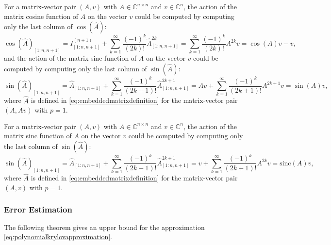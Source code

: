 \begin{corollary}
    \label{cor:embeddedmatrixsineandcosine}
    For a matrix-vector pair $(A, v)$ with $A \in \mathbb{C}^{n \times n}$ and
    $v \in \mathbb{C}^n$, the action of the matrix cosine function
    of $A$ on the vector $v$ could be computed by computing only the last
    column of $\cos(\hat{A})$:
    \begin{equation*}
        \cos(\hat{A})_{[1 : n, n+1]}
        = I^{(n+1)}_{[1 : n, n+1]} + \sum_{k=1}^{\infty}{\frac{(-1)^k}{(2k)!} \hat{A}_{[1 : n, n+1]}^{2k}}
        = \sum_{k=1}^{\infty}{\frac{(-1)^k}{(2k)!} A^{2k} v} = \cos(A)v - v,
    \end{equation*}
    and the action of the matrix sine function
    of $A$ on the vector $v$ could be computed by computing only the last
    column of $\sin(\hat{A})$:
    \begin{equation*}
        \sin(\hat{A})_{[1 : n, n+1]}
        = \hat{A}_{[1 : n, n+1]} + \sum_{k=1}^{\infty}{\frac{(-1)^k}{(2k+1)!} \hat{A}_{[1 : n, n+1]}^{2k+1}}
        = Av + \sum_{k=1}^{\infty}{\frac{(-1)^k}{(2k+1)!} A^{2k+1} v} = \sin(A)v,
    \end{equation*}
    where $\hat{A}$ is defined in \eqref{eq:embeddedmatrixdefinition} for the matrix-vector
    pair $(A, Av)$ with $p=1$.
\end{corollary}

\begin{corollary}
    \label{cor:embeddedmatrixsinc}
    For a matrix-vector pair $(A, v)$ with $A \in \mathbb{C}^{n \times n}$ and
    $v \in \mathbb{C}^n$, the action of the matrix sinc function
    of $A$ on the vector $v$ could be computed by computing only the last
    column of $\sin(\hat{A})$:
    \begin{equation*}
        \sin(\hat{A})_{[1 : n, n+1]}
        = \hat{A}_{[1 : n, n+1]} + \sum_{k=1}^{\infty}{\frac{(-1)^k}{(2k+1)!} \hat{A}_{[1 : n, n+1]}^{2k+1}}
        = v + \sum_{k=1}^{\infty}{\frac{(-1)^k}{(2k+1)!} A^{2k} v} = \mathrm{sinc}(A)v,
    \end{equation*}
    where $\hat{A}$ is defined in \eqref{eq:embeddedmatrixdefinition} for the matrix-vector
    pair $(A, v)$ with $p=1$.
\end{corollary}


\subsubsection{Error Estimation}
The following theorem gives an upper bound for the approximation \eqref{eq:polynomialkrylovapproximation}.

